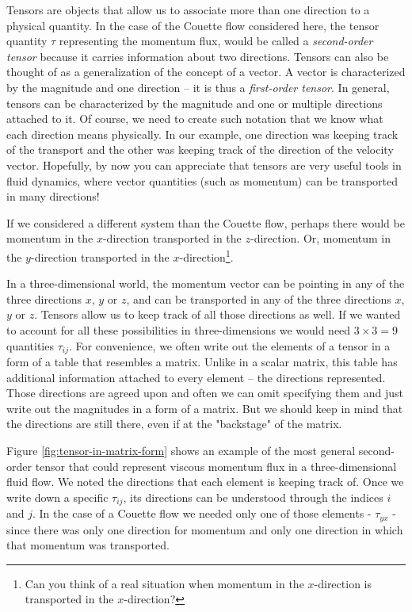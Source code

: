 \documentclass[10pt,twocolumn]{article}
\begin{document}
Tensors are objects that allow us to associate more than one direction to a physical quantity. In the case of the Couette flow considered here, the tensor quantity $\tau$ representing the momentum flux, would be called a \textit{second-order tensor} because it carries information about two directions. Tensors can also be thought of as a generalization of the concept of a vector. A vector is characterized by the magnitude and one direction -- it is thus a \textit{first-order tensor}. In general, tensors can be characterized by the magnitude and one or multiple directions attached to it. Of course, we need to create such notation that we know what each direction means physically. In our example, one direction was keeping track of the transport and the other was keeping track of the direction of the velocity vector. Hopefully, by now you can appreciate that tensors are very useful tools in fluid dynamics, where vector quantities (such as momentum) can be transported in many directions!

If we considered a different system than the Couette flow, perhaps there would be momentum in the $x$-direction transported in the $z$-direction. Or, momentum in the $y$-direction transported in the $x$-direction\footnote{Can you think of a real situation when momentum in the $x$-direction is transported in the $x$-direction?}.

In a three-dimensional world, the momentum vector can be pointing in any of the three directions $x$, $y$ or $z$, and can be transported in any of the three directions $x$, $y$ or $z$. Tensors allow us to keep track of all those directions as well. If we wanted to account for all these possibilities in three-dimensions we would need $3 \times 3 = 9$ quantities $\tau_{ij}$. For convenience, we often write out the elements of a tensor in a form of a table that resembles a matrix. Unlike in a scalar matrix, this table has additional information attached to every element -- the directions represented. Those directions are agreed upon and often we can omit specifying them and just write out the magnitudes in a form of a matrix. But we should keep in mind that the directions are still there, even if at the "backstage" of the matrix.

Figure \ref{fig:tensor-in-matrix-form} shows an example of the most general second-order tensor that could represent viscous momentum flux in a three-dimensional fluid flow. We noted the directions that each element is keeping track of. Once we write down a specific $\tau_{ij}$, its directions can be understood through the indices $i$ and $j$. In the case of a Couette flow we needed only one of those elements - $\tau_{yx}$ - since there was only one direction for momentum and only one direction in which that momentum was transported.
\end{document}
